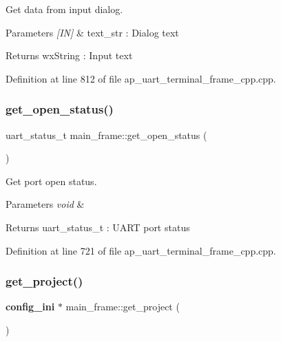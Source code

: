 Get data from input dialog. 


\begin{DoxyParams}{Parameters}
{\em \mbox{[}\+I\+N\mbox{]}} & text\+\_\+str \+: Dialog text \\
\hline
\end{DoxyParams}
\begin{DoxyReturn}{Returns}
wx\+String \+: Input text 
\end{DoxyReturn}


Definition at line 812 of file ap\+\_\+uart\+\_\+terminal\+\_\+frame\+\_\+cpp.\+cpp.

\mbox{\label{group___u_a_r_t__terminal_gaf4df936503d80094bc5923d634245bd3}} 
\subsubsection{get\_open\_status()}
{\footnotesize\ttfamily uart\+\_\+status\+\_\+t main\+\_\+frame\+::get\+\_\+open\+\_\+status (\begin{DoxyParamCaption}\item[{void}]{ }\end{DoxyParamCaption})}



Get port open status. 


\begin{DoxyParams}{Parameters}
{\em void} & \\
\hline
\end{DoxyParams}
\begin{DoxyReturn}{Returns}
uart\+\_\+status\+\_\+t \+: U\+A\+RT port status 
\end{DoxyReturn}


Definition at line 721 of file ap\+\_\+uart\+\_\+terminal\+\_\+frame\+\_\+cpp.\+cpp.

\mbox{\label{group___u_a_r_t__terminal_gab424f472c4eb19cf1a21dd12ae093358}} 
\subsubsection{get\_project()}
{\footnotesize\ttfamily \textbf{ config\+\_\+ini} $\ast$ main\+\_\+frame\+::get\+\_\+project (\begin{DoxyParamCaption}\item[{void}]{ }\end{DoxyParamCaption})}



